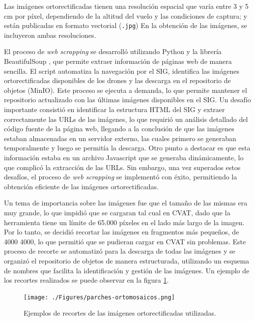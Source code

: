 Las imágenes ortorectificadas tienen una resolución espacial que varía entre 3 y 5 cm por píxel, dependiendo de la altitud del vuelo y las condiciones de captura; y están publicadas en formato vectorial (\lstinline[language=sh]|.jpg|) En la obtención de las imágenes, se incluyeron ambas resoluciones. 

El proceso de \textit{web scrapping} se desarrolló utilizando Python y la librería BeautifulSoup \citep{richardson_beautiful_2007}, que permite extraer información de páginas web de manera sencilla. El script automatiza la navegación por el SIG, identifica las imágenes ortorectificadas disponibles de los drones y las descarga en el repositorio de objetos (MinIO). Este proceso se ejecuta a demanda, lo que permite mantener el repositorio actualizado con las últimas imágenes disponibles en el SIG. Un desafío importante consistió en identificar la estructura HTML del SIG y extraer correctamente las URLs de las imágenes, lo que requirió un análisis detallado del código fuente de la página web, llegando a la conclusión de que las imágenes estaban almacenadas en un servidor externo, las cuales primero se generaban temporalmente y luego se permitía la descarga. Otro punto a destacar es que esta información estaba en un archivo Javascript que se generaba dinámicamente, lo que complicó la extracción de las URLs. Sin embargo, una vez superados estos desafíos, el proceso de \textit{web scrapping} se implementó con éxito, permitiendo la obtención eficiente de las imágenes ortorectificadas.

Un tema de importancia sobre las imágenes fue que el tamaño de las mismas era muy grande, lo que impidió que se cargaran tal cual en CVAT, dado que la herramienta tiene un límite de 65.000 píxeles en el lado más largo de la imagen. Por lo tanto, se decidió recortar las imágenes en fragmentos más pequeños, de \SI{4000}{}\,\texttimes\,\SI{4000}{\pixel}, lo que permitió que se pudieran cargar en CVAT sin problemas. Este proceso de recorte se automatizó para la descarga de todas las imágenes y se organizó el repositorio de objetos de manera estructurada, utilizando un esquema de nombres que facilita la identificación y gestión de las imágenes. Un ejemplo de los recortes realizados se puede observar en la figura \ref{fig:recortes-imagenes}.

\begin{figure}[H]
  \centering
  \texttt{[image: ./Figures/parches-ortomosaicos.png]}
  \caption{Ejemplos de recortes de las imágenes ortorectificadas utilizadas.}
  \label{fig:recortes-imagenes}
\end{figure}

